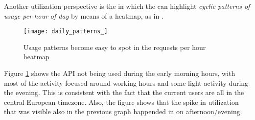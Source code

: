 

Another utilization perspective is the  in which  the \tool can highlight {\em cyclic patterns of usage per hour of day} by means of a heatmap, as in . 


\begin{figure}[!ht]
\centering
\texttt{[image: daily\_patterns\_]}
\caption{Usage patterns become easy to spot in the requests per hour heatmap}
\label{fig:dp}
\end{figure}


Figure \ref{fig:dp} shows the API not being used during the early morning hours, with most of the activity focused around working hours and some light activity during the evening. This is consistent with the fact that the current users are all in the central European timezone. Also, the figure shows that the spike in utilization that was visible also in the previous graph happended in on afternoon/evening.






